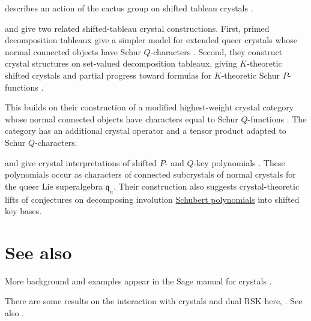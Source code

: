  describes an action of the cactus group on shifted
tableau crystals \cite{Rodrigues2023}.

 and  give two related shifted-tableau
crystal constructions.  First, primed decomposition tableaux give a simpler
model for extended queer crystals whose normal connected objects have Schur
$Q$-characters \cite{MarbergTong2025Primed}.  Second, they construct crystal
structures on set-valued decomposition tableaux, giving $K$-theoretic shifted
crystals and partial progress toward formulas for $K$-theoretic Schur
$P$-functions \cite{MarbergTong2025SetValued}.

This builds on their construction of a modified highest-weight crystal
category whose normal connected objects have characters equal to Schur
$Q$-functions \cite{MarbergTong2023SchurQ}.  The category has an additional
crystal operator and a tensor product adapted to Schur $Q$-characters.

 and  give crystal interpretations
of shifted $P$- and $Q$-key polynomials \cite{MarbergScrimshaw2025}.  These
polynomials occur as characters of connected subcrystals of normal crystals
for the queer Lie superalgebra $\mathfrak{q}_n$.  Their construction also
suggests crystal-theoretic lifts of conjectures on decomposing involution
\hyperref[schubertInvolution]{Schubert polynomials} into shifted key bases.




\section[crystalsSeeAlso]{See also}

More background and examples appear in the Sage manual for crystals
\cite{SageClassicalCrystals}.

There are some results on the interaction with crystals and dual RSK here, \cite{Azenhas2006}.
See also \cite{AzenhasMamede2007Smith}.
